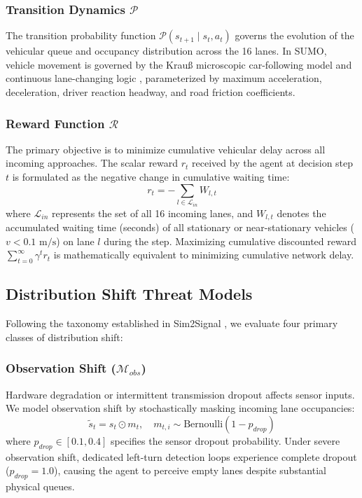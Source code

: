 \documentclass{ieeeaccess}
\begin{document}
\subsubsection{Transition Dynamics $\mathcal{P}$}
The transition probability function $\mathcal{P}(s_{t+1} \mid s_t, a_t)$ governs the evolution of the vehicular queue and occupancy distribution across the 16 lanes. In SUMO, vehicle movement is governed by the Krau{\ss} microscopic car-following model and continuous lane-changing logic \cite{lopez2018microscopic}, parameterized by maximum acceleration, deceleration, driver reaction headway, and road friction coefficients.

\subsubsection{Reward Function $\mathcal{R}$}
The primary objective is to minimize cumulative vehicular delay across all incoming approaches. The scalar reward $r_t$ received by the agent at decision step $t$ is formulated as the negative change in cumulative waiting time:
\begin{equation}
r_t = -\sum_{l \in \mathcal{L}_{in}} W_{l, t}
\label{eq:reward}
\end{equation}
where $\mathcal{L}_{in}$ represents the set of all 16 incoming lanes, and $W_{l, t}$ denotes the accumulated waiting time (seconds) of all stationary or near-stationary vehicles ($v < 0.1 \text{ m/s}$) on lane $l$ during the step. Maximizing cumulative discounted reward $\sum_{t=0}^{\infty} \gamma^t r_t$ is mathematically equivalent to minimizing cumulative network delay.

\subsection{Distribution Shift Threat Models}
Following the taxonomy established in Sim2Signal \cite{alrafi2026sim2signal}, we evaluate four primary classes of distribution shift:

\subsubsection{Observation Shift ($\mathcal{M}_{obs}$)}
Hardware degradation or intermittent transmission dropout affects sensor inputs. We model observation shift by stochastically masking incoming lane occupancies:
\begin{equation}
\tilde{s}_t = s_t \odot m_t, \quad m_{t, i} \sim \text{Bernoulli}(1 - p_{drop})
\end{equation}
where $p_{drop} \in [0.1, 0.4]$ specifies the sensor dropout probability. Under severe observation shift, dedicated left-turn detection loops experience complete dropout ($p_{drop} = 1.0$), causing the agent to perceive empty lanes despite substantial physical queues.
\end{document}

